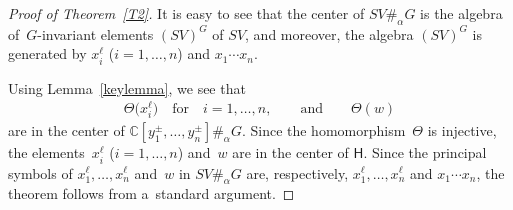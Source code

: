 \documentclass[pdftex]{sigma}
\numberwithin{equation}{section}
\begin{document}
\begin{proof}[Proof of Theorem~\ref{T2}] It is easy to see that the center of $SV\#_\alpha G$ is the algebra of~$G$-invariant
elements $(SV)^G$ of $SV$, and moreover, the algebra $(SV)^G$ is generated by $x_i^\ell$ ($i=1,\ldots,n$) and $x_1\cdots x_n$.

Using Lemma~\ref{keylemma}, we see that
\begin{gather*}
\Theta\big(x_i^\ell\big)
\quad
\text{for}\quad i=1,\ldots, n,
\qquad
\text{and}
\qquad
\Theta(w)
\end{gather*}
are in the center of ${\mathbb{C}}[y_1^\pm, \ldots, y_n^\pm]\#_\alpha G$.
Since the homomorphism~$\Theta$ is injective, the ele\-ments~$x_i^\ell$ ($i=1,\ldots, n$) and~$w$ are in the center of
$\mathsf{H}$.
Since the principal symbols of $x_1^\ell, \ldots, x_n^\ell$ and~$w$ in $SV\#_\alpha G$ are, respectively, $x_1^\ell,
\ldots, x_n^\ell$ and $x_1\cdots x_n$, the theorem follows from a~standard argument.
\end{proof}
\end{document}

